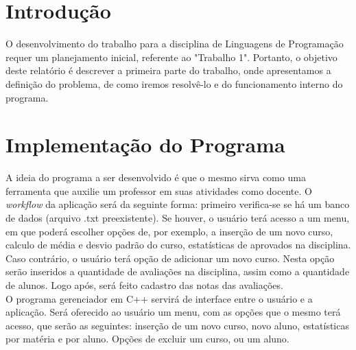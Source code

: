 \documentclass[12pt,a4paper]{article}
\begin{document}
%
%

\pagebreak
\vspace*{-2.0cm}
\section{Introdução}
\vspace*{-0.3cm}
O desenvolvimento do trabalho para a disciplina de Linguagens de Programação requer um planejamento inicial, referente ao "Trabalho 1". Portanto, o objetivo deste relatório é descrever a primeira parte do trabalho, onde apresentamos a definição do problema, de como iremos resolvê-lo e do funcionamento interno do programa.

\vspace*{-0.4cm}
\section{Implementação do Programa}
\vspace*{-0.3cm}
A ideia do programa a ser desenvolvido é que o mesmo sirva como uma ferramenta que auxilie um professor em suas atividades como docente. O \textit{workflow} da aplicação será da seguinte forma: primeiro verifica-se se há um banco de dados (arquivo .txt preexistente). Se houver, o usuário terá acesso a um menu, em que poderá escolher opções de, por exemplo, a inserção de um novo curso, calculo de média e desvio padrão do curso, estatísticas de aprovados na disciplina. Caso contrário, o usuário terá opção de adicionar um novo curso. Nesta opção serão inseridos a quantidade de avaliações na disciplina, assim como a quantidade de alunos. Logo após, será feito cadastro das notas das avaliações. ~\\
\vspace*{-0.05cm}
O programa gerenciador em C++ servirá de interface entre o usuário e a aplicação. Será oferecido ao usuário um menu, com as opções que o mesmo terá acesso, que serão as seguintes: inserção de um novo curso, novo aluno, estatísticas por matéria e por aluno. Opções de excluir um curso, ou um aluno. 
\end{document}
